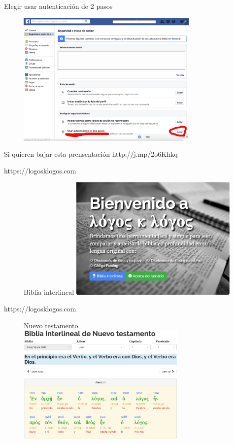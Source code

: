 \documentclass[11pt]{beamer}
\begin{document}
\begin{frame}{Elegir usar autenticaci\'on de 2 pasos}
  \begin{figure}
    \includegraphics[width=3.5in]{images/adentro-seguridad.png}
  \end{figure}
\end{frame}
\begin{frame}
  \begin{block}{Si quieren bajar esta prensentaci\'on}
    http://j.mp/2o6Khkq
  \end{block}
\end{frame}
\begin{frame}{https://logosklogos.com}
  \begin{figure}{Biblia interlineal}
    \includegraphics[width=3.25in]{images/logos-home.png}
  \end{figure}
\end{frame}
\begin{frame}{https://logosklogos.com}
  \begin{figure}{Nuevo testamento}
    \includegraphics[width=3.25in]{images/logos-griego.png}
  \end{figure}
\end{frame}
\end{document}
